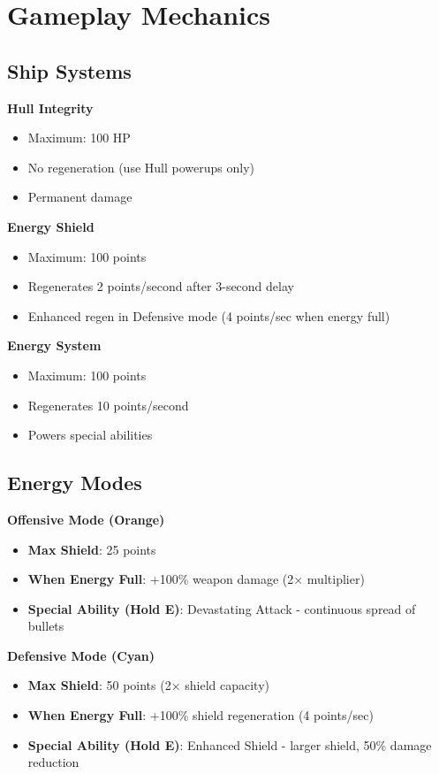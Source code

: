 \documentclass[11pt,a4paper]{article}
\begin{document}
\section{Gameplay Mechanics}

\subsection{Ship Systems}

\textbf{Hull Integrity}
\begin{itemize}
    \item Maximum: 100 HP
    \item No regeneration (use Hull powerups only)
    \item Permanent damage
\end{itemize}

\textbf{Energy Shield}
\begin{itemize}
    \item Maximum: 100 points
    \item Regenerates 2 points/second after 3-second delay
    \item Enhanced regen in Defensive mode (4 points/sec when energy full)
\end{itemize}

\textbf{Energy System}
\begin{itemize}
    \item Maximum: 100 points
    \item Regenerates 10 points/second
    \item Powers special abilities
\end{itemize}

\subsection{Energy Modes}

\textbf{Offensive Mode (Orange)}
\begin{itemize}
    \item \textbf{Max Shield}: 25 points
    \item \textbf{When Energy Full}: +100\% weapon damage (2× multiplier)
    \item \textbf{Special Ability (Hold E)}: Devastating Attack - continuous spread of bullets
\end{itemize}

\textbf{Defensive Mode (Cyan)}
\begin{itemize}
    \item \textbf{Max Shield}: 50 points (2× shield capacity)
    \item \textbf{When Energy Full}: +100\% shield regeneration (4 points/sec)
    \item \textbf{Special Ability (Hold E)}: Enhanced Shield - larger shield, 50\% damage reduction
\end{itemize}
\end{document}
